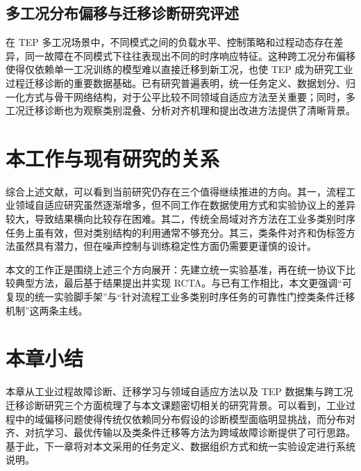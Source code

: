\subsection{多工况分布偏移与迁移诊断研究评述}
在 TEP 多工况场景中，不同模式之间的负载水平、控制策略和过程动态存在差异，同一故障在不同模式下往往表现出不同的时序响应特征。这种跨工况分布偏移使得仅依赖单一工况训练的模型难以直接迁移到新工况，也使 TEP 成为研究工业过程迁移诊断的重要数据基础。已有研究普遍表明，统一任务定义、数据划分、归一化方式与骨干网络结构，对于公平比较不同领域自适应方法至关重要；同时，多工况迁移诊断也为观察类别混叠、分析对齐机理和提出改进方法提供了清晰背景。

\section{本工作与现有研究的关系}
综合上述文献，可以看到当前研究仍存在三个值得继续推进的方向。其一，流程工业领域自适应研究虽然逐渐增多，但不同工作在数据使用方式和实验协议上的差异较大，导致结果横向比较存在困难。其二，传统全局域对齐方法在工业多类别时序任务上虽有效，但对类别结构的利用通常不够充分。其三，类条件对齐和伪标签方法虽然具有潜力，但在噪声控制与训练稳定性方面仍需要更谨慎的设计。

本文的工作正是围绕上述三个方向展开：先建立统一实验基准，再在统一协议下比较典型方法，最后基于结果提出并实现 RCTA。与已有工作相比，本文更强调“可复现的统一实验脚手架”与“针对流程工业多类别时序任务的可靠性门控类条件迁移机制”这两条主线。

\section{本章小结}
本章从工业过程故障诊断、迁移学习与领域自适应方法以及 TEP 数据集与跨工况迁移诊断研究三个方面梳理了与本文课题密切相关的研究背景。可以看到，工业过程中的域偏移问题使得传统仅依赖同分布假设的诊断模型面临明显挑战，而分布对齐、对抗学习、最优传输以及类条件迁移等方法为跨域故障诊断提供了可行思路。基于此，下一章将对本文采用的任务定义、数据组织方式和统一实验设定进行系统说明。
